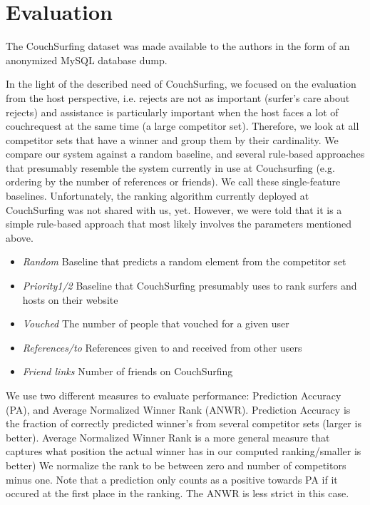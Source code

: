 \section{Evaluation} \label{sec:evaluation}

The CouchSurfing dataset was made available to the authors in the form of an anonymized MySQL database dump.

In the light of the described need of CouchSurfing, we focused on the evaluation from the host perspective, i.e. rejects are not as important (surfer's care about rejects) and assistance is particularly important when the host faces a lot of couchrequest at the same time (a large competitor set). Therefore, we look at all competitor sets that have a winner and group them by their cardinality. We compare our system against a random baseline, and several rule-based approaches that presumably resemble the system currently in use at Couchsurfing (e.g. ordering by the number of references or friends). We call these single-feature baselines. Unfortunately, the ranking algorithm currently deployed at CouchSurfing was not shared with us, yet. However, we were told that it is a simple rule-based approach that most likely involves the parameters mentioned above.

\begin{itemize}
\item \textit{Random} Baseline that predicts a random element from the
competitor set
\item \textit{Priority1/2} Baseline that CouchSurfing presumably uses
to rank surfers and hosts on their website
\item \textit{Vouched} The number of people that vouched for a given user
\item \textit{References/to} References given to and received from other users
\item \textit{Friend links} Number of friends on CouchSurfing
\end{itemize}

We use two different measures to evaluate performance: Prediction Accuracy (PA), and Average Normalized Winner Rank (ANWR). Prediction Accuracy is the fraction of correctly predicted winner's from several competitor sets (larger is better). Average Normalized Winner Rank is a more general measure that captures what position the actual winner has in our computed ranking/smaller is better) We normalize the rank to be between zero and number of competitors minus one. Note that a prediction only counts as a positive towards PA if it occured at the first place in the ranking. The ANWR is less strict in this case.

